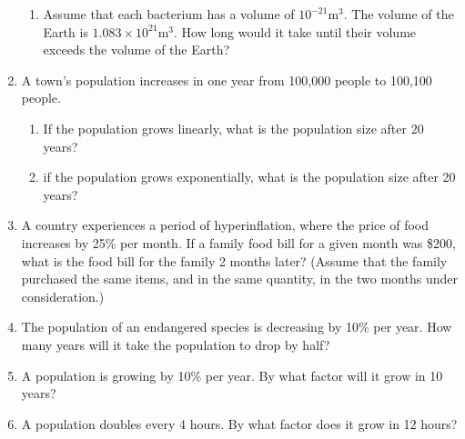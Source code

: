 \documentclass[11pt,dvipsnames]{article}
\begin{document}
\begin{enumerate}[label= {\bf  \arabic*:}, leftmargin=*]
\begin{enumerate}

\item Assume that each bacterium has a volume of $\displaystyle 10^{-21} \text{m} ^3$. The volume of the Earth is $\displaystyle 1.083\times 10^{21 }\text{m}^3$. How long would it take until their volume exceeds the volume of the Earth?


\end{enumerate}


	\item A town's population increases in one year from 100,000 people to 100,100 people.
	\begin{enumerate}
		\item If the population grows linearly, what is the population size after 20 years?
		\item if the population grows exponentially, what is the population size after 20 years?
	\end{enumerate}
	\item A country experiences a period of hyperinflation, where the price of food increases by 25\% per month. If a family food bill for a given month was \$200, what is the food bill for the family 2 months later? (Assume that the family purchased the same items, and in the same quantity, in the two months under consideration.)

\item The population of an endangered species is decreasing by 10\% per year. How many years will it take the population to drop by half?
\item A population is growing by 10\% per year. By what factor will it grow in 10 years?
\item A population doubles every 4 hours. By what factor does it grow in 12 hours?
\end{enumerate}
\end{document}

